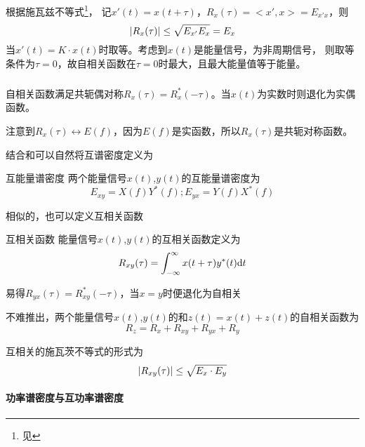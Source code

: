     \Proof
    根据施瓦兹不等式\footnote{见}，
    记$x'(t)=x(t+\tau)$，$R_x(\tau)=<x',x>=E_{x'x}$，则
    \begin{equation}
            \left\vert R_x(\tau) \right\vert\leq \sqrt{E_{x'}E_x}=E_x
    \end{equation}
    当$x'(t)=K\cdot x(t)$时取等。考虑到$x(t)$是能量信号，为非周期信号，
    则取等条件为$\tau=0$，故自相关函数在$\tau =0$时最大，且最大能量值等于能量。
    \subparagraph{\hspace{-1em}}自相关函数满足共轭偶对称$R_x(\tau)=R^*_x(-\tau)$。当$x(t)$为实数时则退化为实偶函数。
    
    \Proof 注意到$R_x(\tau)\leftrightarrow E(f)$，因为$E(f)$是实函数，所以$R_x(\tau)$是共轭对称函数。

    结合和可以自然将互谱密度定义为
    \begin{mydef}{互能量谱密度}
        两个能量信号$x(t)$,$y(t)$的互能量谱密度为
        \begin{equation}
            E_{xy}=X(f)Y^*(f);E_{yx}=Y(f)X^*(f)
        \end{equation}
    \end{mydef}
    相似的，也可以定义互相关函数
    \begin{mydef}{互相关函数}
        能量信号$x(t)$,$y(t)$的互相关函数定义为
        \begin{equation}
            R_{xy}(\tau)=\int_{-\infty}^{\infty}x(t+\tau)y^*(t)\text{\upshape d} t
        \end{equation}
    \end{mydef}
    易得$R_{yx}(\tau)=R_{xy}^*(-\tau)$，当$x=y$时便退化为自相关

    不难推出，两个能量信号$x(t)$,$y(t)$的和$z(t)=x(t)+z(t)$的自相关函数为
    \begin{equation}
        R_z=R_x+R_{xy}+R_{yx}+R_y
    \end{equation}
    
    互相关的施瓦茨不等式的形式为
    \begin{equation}
        \left\vert R_{xy}(\tau) \right\vert\leq\sqrt{E_x\cdot E_y}
    \end{equation}
    \newpage%
    \paragraph{功率谱密度与互功率谱密度}\mbox{}

